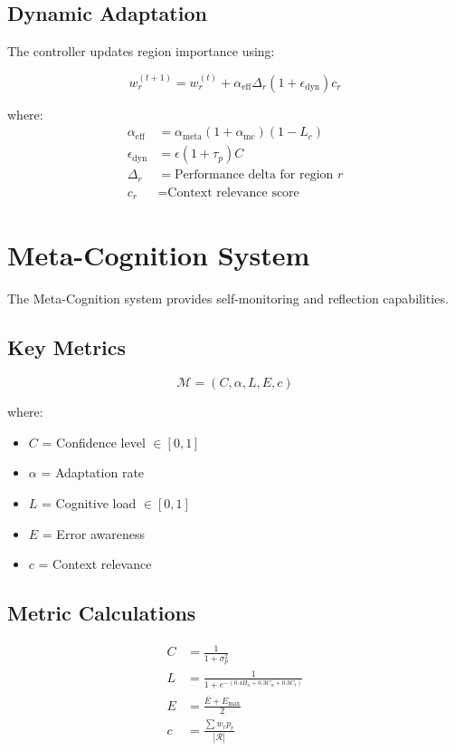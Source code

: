 \documentclass{article}
\begin{document}
\subsection{Dynamic Adaptation}

The controller updates region importance using:

\begin{equation}
w_r^{(t+1)} = w_r^{(t)} + \alpha_{\text{eff}} \Delta_r (1 + \epsilon_{\text{dyn}}) c_r
\end{equation}

where:
\begin{align*}
\alpha_{\text{eff}} &= \alpha_{\text{meta}}(1 + \alpha_{\text{mc}})(1 - L_c) \\
\epsilon_{\text{dyn}} &= \epsilon(1 + \tau_p)C \\
\Delta_r &= \text{Performance delta for region } r \\
c_r &= \text{Context relevance score}
\end{align*}

\section{Meta-Cognition System}

The Meta-Cognition system provides self-monitoring and reflection capabilities.

\subsection{Key Metrics}

\begin{equation}
\mathcal{M} = (C, \alpha, L, E, c)
\end{equation}

where:
\begin{itemize}
\item $C$ = Confidence level $\in [0,1]$
\item $\alpha$ = Adaptation rate
\item $L$ = Cognitive load $\in [0,1]$
\item $E$ = Error awareness
\item $c$ = Context relevance
\end{itemize}

\subsection{Metric Calculations}

\begin{align}
C &= \frac{1}{1 + \sigma_p^2} \\
L &= \frac{1}{1 + e^{-(0.4H_a + 0.3C_w + 0.3C_t)}} \\
E &= \frac{\bar{E} + E_{\max}}{2} \\
c &= \frac{\sum w_r p_r}{|\mathcal{R}|}
\end{align}
\end{document}
